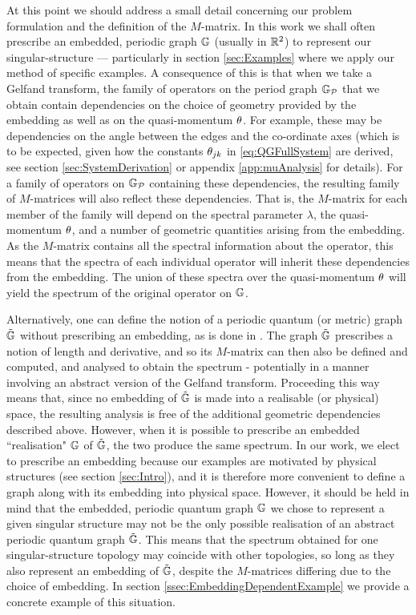 At this point we should address a small detail concerning our problem formulation and the definition of the $M$-matrix.
In this work we shall often prescribe an embedded, periodic graph $\mathbb{G}$ (usually in $\mathbb{R}^2$) to represent our singular-structure --- particularly in section \ref{sec:Examples} where we apply our method of specific examples.
A consequence of this is that when we take a Gelfand transform, the family of operators on the period graph $\mathbb{G}_{\mathcal{P}}$ that we obtain contain dependencies on the choice of geometry provided by the embedding as well as on the quasi-momentum $\theta$.
For example, these may be dependencies on the angle between the edges and the co-ordinate axes (which is to be expected, given how the constants $\theta_{jk}$ in \eqref{eq:QGFullSystem} are derived, see section \ref{sec:SystemDerivation} or appendix \ref{app:muAnalysis} for details).
For a family of operators on $\mathbb{G}_{\mathcal{P}}$ containing these dependencies, the resulting family of  $M$-matrices will also reflect these dependencies.
That is, the $M$-matrix for each member of the family will depend on the spectral parameter $\lambda$, the quasi-momentum $\theta$, and a number of geometric quantities arising from the embedding.
As the $M$-matrix contains all the spectral information about the operator, this means that the spectra of each individual operator will inherit these dependencies from the embedding. 
The union of these spectra over the quasi-momentum $\theta$ will yield the spectrum of the original operator on $\mathbb{G}$.

Alternatively, one can define the notion of a periodic quantum (or metric) graph $\tilde{\mathbb{G}}$ without prescribing an embedding, as is done in \cite[Chapter~4]{berkolaiko2013introduction}.
The graph $\tilde{\mathbb{G}}$ prescribes a notion of length and derivative, and so its $M$-matrix can then also be defined and computed, and analysed to obtain the spectrum - potentially in a manner involving an abstract version of the Gelfand transform.
Proceeding this way means that, since no embedding of $\tilde{\mathbb{G}}$ is made into a realisable (or physical) space, the resulting analysis is free of the additional geometric dependencies described above.
However, when it is possible to prescribe an embedded ``realisation" $\mathbb{G}$ of $\tilde{\mathbb{G}}$, the two produce the same spectrum.
In our work, we elect to prescribe an embedding because our examples are motivated by physical structures (see section \ref{sec:Intro}), and it is therefore more convenient to define a graph along with its embedding into physical space.
However, it should be held in mind that the embedded, periodic quantum graph $\mathbb{G}$ we chose to represent a given singular structure may not be the only possible realisation of an abstract periodic quantum graph $\tilde{\mathbb{G}}$.
This means that the spectrum obtained for one singular-structure topology may coincide with other topologies, so long as they also represent an embedding of $\tilde{\mathbb{G}}$, despite the $M$-matrices differing due to the choice of embedding.
In section \ref{ssec:EmbeddingDependentExample} we provide a concrete example of this situation.
